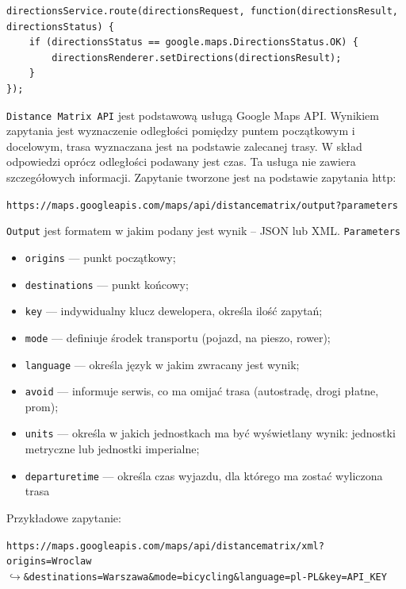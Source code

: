 \documentclass[eng,printmode,oneside]{mgr}
\begin{document}
\begin{lstlisting}[caption=Przykład wywołania
funkcji \texttt{route()},label=lst:DirectionsService]
directionsService.route(directionsRequest, function(directionsResult, directionsStatus) { 
	if (directionsStatus == google.maps.DirectionsStatus.OK) {
		directionsRenderer.setDirections(directionsResult);
	}
});
\end{lstlisting}

\texttt{Distance Matrix API} jest podstawową usługą Google Maps API. Wynikiem
zapytania jest wyznaczenie odległości pomiędzy puntem początkowym i docelowym,
trasa wyznaczana jest na podstawie zalecanej trasy. W skład odpowiedzi oprócz
odległości podawany jest czas. Ta usługa nie zawiera szczegółowych informacji.
Zapytanie tworzone jest na podstawie zapytania http:

\texttt{https://maps.googleapis.com/maps/api/distancematrix/output?parameters}

\texttt{Output} jest formatem w jakim podany jest wynik -- JSON lub XML.
\texttt{Parameters} 
\begin{itemize}
  \item \texttt{origins} --- punkt początkowy;
  \item \texttt{destinations} --- punkt końcowy;
  \item \texttt{key} --- indywidualny klucz dewelopera, określa ilość zapytań;
  \item \texttt{mode} --- definiuje środek transportu (pojazd, na pieszo, rower);
  \item \texttt{language} --- określa język w jakim zwracany jest wynik;
  \item \texttt{avoid} --- informuje serwis, co ma omijać trasa (autostradę,
  drogi płatne, prom);
  \item \texttt{units} --- określa w jakich jednostkach ma być wyświetlany wynik:
  jednostki metryczne lub jednostki imperialne;
  \item \texttt{departure\-time} --- określa czas wyjazdu, dla którego ma zostać
  wyliczona trasa
\end{itemize}

Przykładowe zapytanie:

\begin{flushright}
\texttt{https://maps.googleapis.com/maps/api/distancematrix/xml?origins=Wroclaw
\\$\hookrightarrow$\&destinations=Warszawa\&mode=bicycling\&language=pl-PL\&key=API\_KEY}
\end{flushright}
\end{document}
